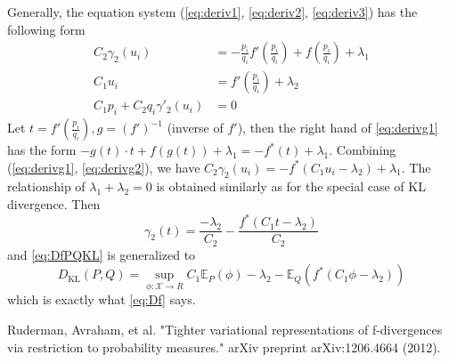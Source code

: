 \documentclass{article}
\theoremstyle{definition}
\begin{document}
Generally, the equation system (\ref{eq:deriv1}, \ref{eq:deriv2}, \ref{eq:deriv3})
has the following form
\begin{align}
C_2 \gamma_2(u_i) & = -\frac{p_i}{q_i}f'(\frac{p_i}{q_i}) + f(\frac{p_i}{q_i}) + \lambda_1 \label{eq:derivg1}\\
C_1 u_i & = f'( \frac{p_i}{q_i}) + \lambda_2 \label{eq:derivg2}\\
C_1 p_i + C_2 q_i \gamma'_2(u_i) &= 0 \label{eq:derivg3}
\end{align}
Let $t=f'(\frac{p_i}{q_i}), g= (f')^{-1}$ (inverse of $f'$), then the right hand of \eqref{eq:derivg1} has the form
$-g(t) \cdot t + f(g(t))+\lambda_1 = -f^*(t) + \lambda_1$.
Combining (\ref{eq:derivg1}, \ref{eq:derivg2}), we have
$C_2 \gamma_2(u_i) = -f^*(C_1 u_i - \lambda_2) + \lambda_1$.
The relationship of $\lambda_1 + \lambda_2 = 0$ is obtained similarly as for the special case
of KL divergence. Then
\begin{equation}
\gamma_2(t) = \frac{-\lambda_2}{C_2} - \frac{f^*(C_1 t - \lambda_2)}{C_2}
\end{equation}
and \eqref{eq:DfPQKL} is generalized to
\begin{equation}
D_{\textrm{KL}}(P, Q) = \sup_{\phi: \mathcal{X} \to R} C_1 \mathbb{E}_P(\phi) -\lambda_2  - \mathbb{E}_Q(f^*(C_1 \phi - \lambda_2))
\end{equation}
which is exactly what \eqref{eq:Df} says.
\begin{thebibliography}{9}
	 Ruderman, Avraham, et al. "Tighter variational representations of f-divergences via restriction to probability measures." arXiv preprint arXiv:1206.4664 (2012).
\end{thebibliography}
\end{document}
